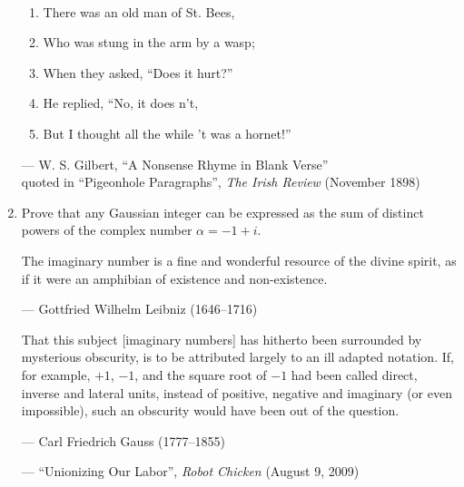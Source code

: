 \documentclass[11pt]{article}
\begin{document}
\begin{enumerate}
\begin{solution}~
\begin{enumerate}
\item
There was an old man of St. Bees,

\item
Who was stung in the arm by a wasp;

\item
When they asked, “Does it hurt?”

\item
He replied, “No, it does n’t,

\item 
But I thought all the while 't was a hornet!”
\end{enumerate}

\begin{flushright}
--- W. S. Gilbert, “A Nonsense Rhyme in Blank Verse”\\
quoted in “Pigeonhole Paragraphs”, \emph{The Irish Review} (November 1898)
\end{flushright}
\end{solution}



\newpage
\Hard
\item {}
Prove that any Gaussian integer can be expressed as the sum of distinct powers of the complex number $\alpha = -1+i$.

\begin{solution}
The imaginary number is a fine and wonderful resource of the divine spirit, as if it were an amphibian of existence and non-existence.
\begin{flushright}
--- Gottfried Wilhelm Leibniz (1646--1716)
\end{flushright}

\medskip
\noindent
That this subject [imaginary numbers] has hitherto been surrounded by mysterious obscurity, is to be attributed largely to an ill adapted notation. If, for example, $+1$, $-1$, and the square root of $-1$ had been called direct, inverse and lateral units, instead of positive, negative and imaginary (or even impossible), such an obscurity would have been out of the question.
\begin{flushright}
--- Carl Friedrich Gauss (1777--1855)
\end{flushright}

\medskip
\noindent
{}
\begin{flushright}
--- “Unionizing Our Labor”, \emph{Robot Chicken} (August 9, 2009)
\end{flushright}
\end{solution}



\end{enumerate}
\end{document}
